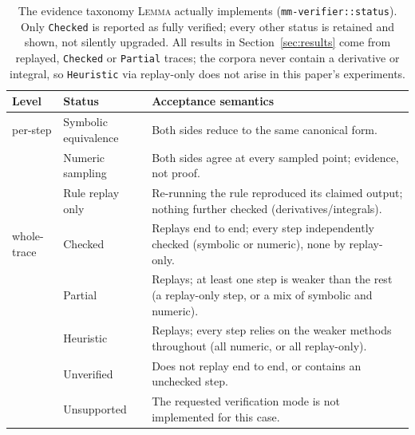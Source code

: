 \documentclass[11pt]{article}
\numberwithin{equation}{section}
\newcommand{\lemma}{\textsc{Lemma}}
\begin{document}
\begin{table}[htbp]
\centering
\small
\begin{tabular}{@{}ll>{\raggedright\arraybackslash}p{7.6cm}@{}}
\toprule
Level & Status & Acceptance semantics \\
\midrule
per-step & Symbolic equivalence & Both sides reduce to the same canonical form. \\
 & Numeric sampling & Both sides agree at every sampled point; evidence, not proof. \\
 & Rule replay only & Re-running the rule reproduced its claimed output; nothing further checked (derivatives/integrals). \\
\midrule
whole-trace & Checked & Replays end to end; every step independently checked (symbolic or numeric), none by replay-only. \\
 & Partial & Replays; at least one step is weaker than the rest (a replay-only step, or a mix of symbolic and numeric). \\
 & Heuristic & Replays; every step relies on the weaker methods throughout (all numeric, or all replay-only). \\
 & Unverified & Does not replay end to end, or contains an unchecked step. \\
 & Unsupported & The requested verification mode is not implemented for this case. \\
\bottomrule
\end{tabular}
\caption{The evidence taxonomy \lemma{} actually implements (\texttt{mm-verifier::status}). Only \texttt{Checked} is reported as fully verified; every other status is retained and shown, not silently upgraded. All results in Section~\ref{sec:results} come from replayed, \texttt{Checked} or \texttt{Partial} traces; the corpora never contain a derivative or integral, so \texttt{Heuristic} via replay-only does not arise in this paper's experiments.}
\label{tab:evidence}
\end{table}
\end{document}

